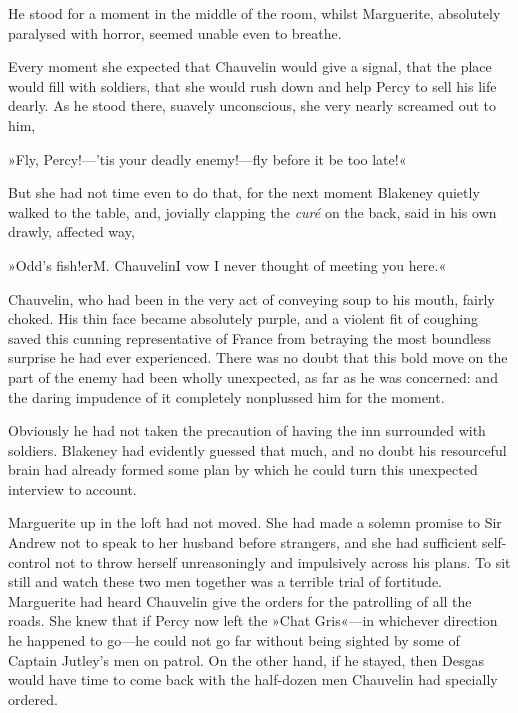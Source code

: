 He stood for a moment in the middle of the room, whilst Marguerite, absolutely paralysed with horror, seemed unable even to breathe.

Every moment she expected that Chauvelin would give a signal, that the place would fill with soldiers, that she would rush down and help Percy to sell his life dearly. As he stood there, suavely unconscious, she very nearly screamed out to him,\longdash


»Fly, Percy!—'tis your deadly enemy!—fly before it be too late!«

But she had not time even to do that, for the next moment Blakeney quietly walked to the table, and, jovially clapping the \textit{curé} on the back, said in his own drawly, affected way,\longdash


»Odd's fish!\textellipsis \allowbreak  er\textellipsis \allowbreak  M. Chauvelin\textellipsis \allowbreak  I vow I never thought of meeting you here.«

Chauvelin, who had been in the very act of conveying soup to his mouth, fairly choked. His thin face became absolutely purple, and a violent fit of coughing saved this cunning representative of France from betraying the most boundless surprise he had ever experienced. There was no doubt that this bold move on the part of the enemy had been wholly unexpected, as far as he was concerned: and the daring impudence of it completely nonplussed him for the moment.

Obviously he had not taken the precaution of having the inn surrounded with soldiers. Blakeney had evidently guessed that much, and no doubt his resourceful brain had already formed some plan by which he could turn this unexpected interview to account.

Marguerite up in the loft had not moved. She had made a solemn promise to Sir Andrew not to speak to her husband before strangers, and she had sufficient self-control not to throw herself unreasoningly and impulsively across his plans. To sit still and watch these two men together was a terrible trial of fortitude. Marguerite had heard Chauvelin give the orders for the patrolling of all the roads. She knew that if Percy now left the »Chat Gris«—in whichever direction he happened to go—he could not go far without being sighted by some of Captain Jutley's men on patrol. On the other hand, if he stayed, then Desgas would have time to come back with the half-dozen men Chauvelin had specially ordered.

